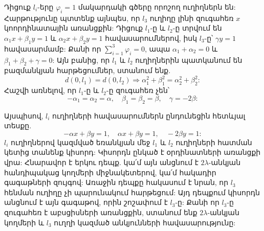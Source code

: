 \documentclass[12pt,a4paper]{article}
\numberwithin{equation}{section}
\numberwithin{figure}{section}
\begin{document}
Դիցուք $l_i$-երը $\varphi_i = 1$ մակարդակի գծերը որոշող ուղիղներն են: Հարթությունը պտտենք այնպես, որ $l_3$ ուղիղը լինի զուգահեռ $x$ կոորդինատային առանցքին: Դիցուք $l_1$-ը և $l_2$-ը տրվում են $\alpha_1 x + \beta_1 y = 1$ և $\alpha_2 x + \beta_2 y = 1$ հավասարումներով, իսկ $l_3$-ը՝ $\gamma y = 1$ հավասարմամբ: Քանի որ $\sum_{i=1}^3 \varphi_i = 0$, ապա $\alpha_1 + \alpha_2 = 0$ և $\beta_1 + \beta_2 + \gamma = 0$: Այն բանից, որ $l_1$ և $l_2$ ուղիղներին պատկանում են բազմանկյան հարթեցումներ, ստանում ենք.
\begin{equation*}
    d(0, l_1) = d(0, l_2) \Rightarrow \alpha_1^2 + \beta_1^2 = \alpha_2^2 + \beta_2^2:
\end{equation*}
Հաշվի առնելով, որ $l_1$-ը և $l_2$-ը զուգահեռ չեն՝
\begin{equation*}
    -\alpha_1 = \alpha_2 = \alpha, \quad \beta_1 = \beta_2 = \beta, \quad \gamma = -2\beta:
\end{equation*}

Այսպիսով, $l_i$ ուղիղների հավասարումներն ընդունեցին հետևյալ տեսքը.
\begin{equation*}
    -\alpha x + \beta y = 1, \quad \alpha x + \beta y = 1, \quad -2\beta y = 1:
\end{equation*}
$l_i$ ուղիղներով կազմված եռանկյան մեջ $l_1$ և $l_2$ ուղիղների հատման կետից տանենք կիսորդ: Կիսորդն ընկած է օրդինատների առանցքի վրա: Հնարավոր է երկու դեպք. կա՛մ այն անցնում է $2\lambda$-անկյան հանդիպակաց կողմերի միջնակետերով, կա՛մ հակադիր գագաթների զույգով: Առաջին դեպքը հակասում է նրան, որ $l_3$ հենման ուղիղը չի պարունակում հարթեցում: Այդ դեպքում կիսորդն անցնում է այն գագաթով, որին շոշափում է $l_3$-ը: Քանի որ $l_3$-ը զուգահեռ է աբսցիսների առանցքին, ստանում ենք $2\lambda$-անկյան կողմերի և $l_3$ ուղղի կազմած անկյունների հավասարությունը:
\end{document}
